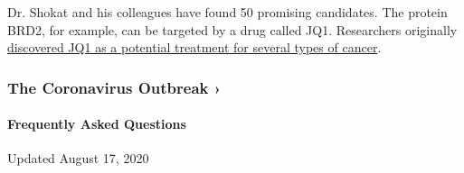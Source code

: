 Dr. Shokat and his colleagues have found 50 promising candidates. The
protein BRD2, for example, can be targeted by a drug called JQ1.
Researchers originally
\href{https://www.ncbi.nlm.nih.gov/pmc/articles/PMC3010259/}{discovered
JQ1 as a potential treatment for several types of cancer}.

\href{https://www.nytimes3xbfgragh.onion/news-event/coronavirus?action=click\&pgtype=Article\&state=default\&region=MAIN_CONTENT_3\&context=storylines_faq}{}

\hypertarget{the-coronavirus-outbreak-}{%
\subsubsection{The Coronavirus Outbreak
›}\label{the-coronavirus-outbreak-}}

\hypertarget{frequently-asked-questions}{%
\paragraph{Frequently Asked
Questions}\label{frequently-asked-questions}}

Updated August 17, 2020

